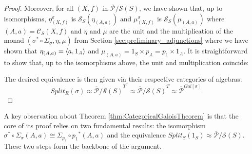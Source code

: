 \begin{theorem}
\begin{proof}
        Moreover, for all $(X,f)$ in $\overline{\mathcal{P}}/\mathcal{S}(S)$, we have shown that, up to isomorphisms, $\eta^\sigma_{(X,f)}$ is $\mathcal{S}_S(\eta_{(A,a)})$ and $\mu^\sigma_{(X,f)}$ is $\mathcal{S}_S(\mu_{(A,a)})$ where $(A,a)=\mathcal{C}_S(X,f)$ and $\eta$ and $\mu$ are the unit and the multiplication of the monad $(\sigma^*\circ\Sigma_\sigma, \eta, \mu)$ from Section \ref{sec:preliminary_adjunctions} where we have shown that $\eta_{(A,a)} = \langle{a},{1_A}\rangle$ and $\mu_{(A,a)} = 1_S\times p_A = p_1\times1_A$. It is straightforward to show that, up to the isomorphisms above, the unit and multiplication coincide:
        \begin{center}
        \end{center}
        \begin{center}
        \end{center}

        The desired equivalence is then given via their respective categories of algebras:
        \[ Split_R(\sigma)\approx{\overline{\mathcal{P}}/\mathcal{S}(S)}^{T^\sigma}\approx{\overline{\mathcal{P}}/\mathcal{S}(S)}^T\approx\overline{\mathcal{P}}^{Gal[\sigma]}. \]
    \end{proof}
\end{theorem}

\begin{oss*}
    A key observation about Theorem \ref{thm:CategoricalGaloisTheorem} is that the core of its proof relies on two fundamental results: the isomorphism $\sigma^*\circ\Sigma_\sigma(A,a)\cong\Sigma_{p_2}\circ{p_1}^*(A,a)$ and the equivalence $Split_S(1_S)\approx\overline{\mathcal{P}}/\mathcal{S}(S)$. These two steps form the backbone of the argument.
\end{oss*}